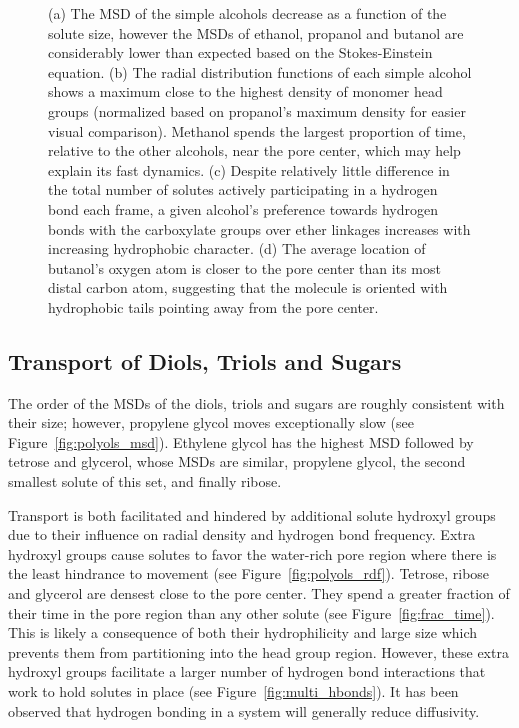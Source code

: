 \documentclass[journal=jpcbfk,manuscript=article]{achemso}
\begin{document}
\begin{figure}[!htb]
  \caption{(a) The MSD of the simple alcohols decrease as a function of the
  solute size, however the MSDs of ethanol, propanol and butanol are considerably
  lower than expected based on the Stokes-Einstein equation. (b) The radial 
  distribution functions of each simple alcohol shows a maximum close to the
  highest density of monomer head groups (normalized based on propanol's maximum
  density for easier visual comparison). Methanol spends the largest proportion 
  of time, relative to the other alcohols, near the pore center, which may help
  explain its fast dynamics. (c) Despite relatively little difference in the 
  total number of solutes actively participating in a hydrogen bond each frame,
  a given alcohol's preference towards hydrogen bonds with the carboxylate groups
  over ether linkages increases with increasing hydrophobic character. (d) The average location of 
  butanol's oxygen atom is closer to the pore center than its most distal carbon
  atom, suggesting that the molecule is oriented with hydrophobic tails pointing
  away from the pore center.}\label{fig:simple_alcohols}
  \end{figure}

  \subsection{Transport of Diols, Triols and Sugars}\label{section:polyols}
  
  The order of the MSDs of the diols, triols and sugars are roughly consistent with 
  their size; however, propylene glycol moves exceptionally slow (see 
  Figure~\ref{fig:polyols_msd}). Ethylene glycol has the highest MSD followed
  by tetrose and glycerol, whose MSDs are similar, propylene glycol, the second
  smallest solute of this set, and finally ribose.
  
  Transport is both facilitated and hindered by additional solute hydroxyl groups
  due to their influence on radial density and hydrogen bond frequency. Extra 
  hydroxyl groups cause solutes to favor the water-rich pore region where there 
  is the least hindrance to movement (see Figure~\ref{fig:polyols_rdf}). Tetrose,
  ribose and glycerol are densest close to the pore center. They spend a greater
  fraction of their time in the pore region than any other solute (see 
  Figure~\ref{fig:frac_time}). This is likely a consequence of both their 
  hydrophilicity and large size which prevents them from partitioning into the 
  head group region. However, these extra hydroxyl groups facilitate a larger 
  number of hydrogen bond interactions that work to hold solutes in place (see 
  Figure~\ref{fig:multi_hbonds}). It has been observed that hydrogen bonding 
  in a system will generally reduce diffusivity.~\cite{srinivas_computer_1999}
  
\end{document}
